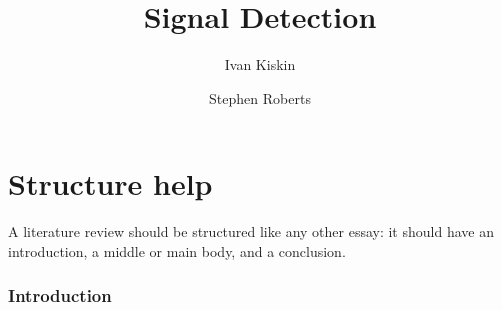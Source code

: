 \documentclass[12pt]{llncs}
\begin{document}
%


%
\pagestyle{headings}  %

%
\mainmatter              %


\title{Signal Detection}
%

%
\author{Ivan Kiskin \and Stephen Roberts}
%
%
%


\maketitle              %


\section*{Structure help}
A literature review should be structured like any other essay: it should have an introduction, a middle or main body, and a conclusion.

\subsubsection*{Introduction}

\color{red} 
\end{document}
